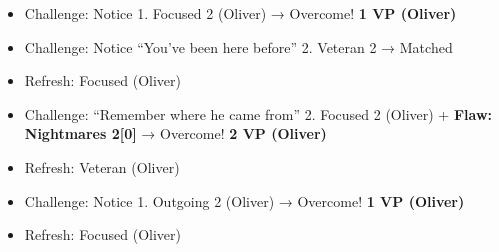 
{
\parskip=0pt
\begin{itemize}
\item Challenge: Notice 1.  Focused 2 (Oliver) → Overcome! \textbf{1 VP (Oliver)}
\item Challenge: Notice ``You've been here before'' 2.  Veteran 2 → Matched
\item Refresh: Focused (Oliver)
\item Challenge: ``Remember where he came from'' 2.  Focused 2 (Oliver) + \textbf{ {\color[RGB]{255,0,0}Flaw: Nightmares 2{[}0{]}} } → Overcome! \textbf{2 VP (Oliver)}
\end{itemize}

\begin{itemize}
\item Refresh: Veteran (Oliver)
\end{itemize}

\begin{itemize}
\item Challenge: Notice 1.  Outgoing 2 (Oliver) → Overcome! \textbf{1 VP (Oliver)}
\end{itemize}

\begin{itemize}
\item Refresh: Focused (Oliver)
\end{itemize}

}
